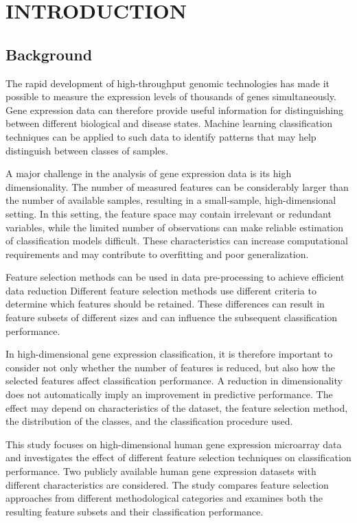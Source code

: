 \chapter{INTRODUCTION}

\section{Background}

The rapid development of high-throughput genomic technologies has made it possible to measure the expression levels of thousands of genes simultaneously. Gene expression data can therefore provide useful information for distinguishing between different biological and disease states. Machine learning classification techniques can be applied to such data to identify patterns that may help distinguish between classes of samples.

A major challenge in the analysis of gene expression data is its high dimensionality. The number of measured features can be considerably larger than the number of available samples, resulting in a small-sample, high-dimensional setting. In this setting, the feature space may contain irrelevant or redundant variables, while the limited number of observations can make reliable estimation of classification models difficult. These characteristics can increase computational requirements and may contribute to overfitting and poor generalization.

Feature selection methods can be used in 
data pre-processing to achieve efficient data reduction\citep{8677302}
Different feature selection methods use different criteria to determine which features should be retained. These differences can result in feature subsets of different sizes and can influence the subsequent classification performance.

In high-dimensional gene expression classification, it is therefore important to consider not only whether the number of features is reduced, but also how the selected features affect classification performance. A reduction in dimensionality does not automatically imply an improvement in predictive performance. The effect may depend on characteristics of the dataset, the feature selection method, the distribution of the classes, and the classification procedure used.

This study focuses on high-dimensional human gene expression microarray data and investigates the effect of different feature selection techniques on classification performance. Two publicly available human gene expression datasets with different characteristics are considered. The study compares feature selection approaches from different methodological categories and examines both the resulting feature subsets and their classification performance.


